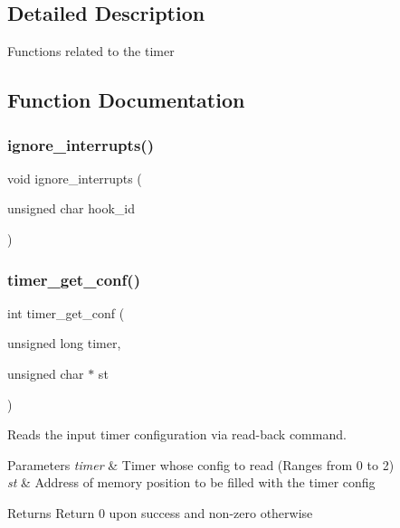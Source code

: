 \subsection{Detailed Description}
Functions related to the timer 

\subsection{Function Documentation}
\hypertarget{group__timer_ga05c1893c9a1e24ff5d76b2958adb8851}{}\label{group__timer_ga05c1893c9a1e24ff5d76b2958adb8851} 
\subsubsection{\texorpdfstring{ignore\+\_\+interrupts()}{ignore\_interrupts()}}
{\footnotesize\ttfamily void ignore\+\_\+interrupts (\begin{DoxyParamCaption}\item[{unsigned char}]{hook\+\_\+id }\end{DoxyParamCaption})}

\hypertarget{group__timer_ga8eb3357bc05265afc4bea5bbbb480a53}{}\label{group__timer_ga8eb3357bc05265afc4bea5bbbb480a53} 
\subsubsection{\texorpdfstring{timer\+\_\+get\+\_\+conf()}{timer\_get\_conf()}}
{\footnotesize\ttfamily int timer\+\_\+get\+\_\+conf (\begin{DoxyParamCaption}\item[{unsigned long}]{timer,  }\item[{unsigned char $\ast$}]{st }\end{DoxyParamCaption})}



Reads the input timer configuration via read-\/back command. 


\begin{DoxyParams}{Parameters}
{\em timer} & Timer whose config to read (Ranges from 0 to 2) \\
\hline
{\em st} & Address of memory position to be filled with the timer config \\
\hline
\end{DoxyParams}
\begin{DoxyReturn}{Returns}
Return 0 upon success and non-\/zero otherwise 
\end{DoxyReturn}
\hypertarget{group__timer_gada4efbb5c88275795526fc45f0814aa3}{}\label{group__timer_gada4efbb5c88275795526fc45f0814aa3} 
